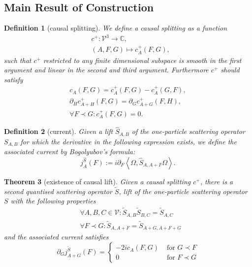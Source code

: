 \documentclass[b5paper,draft,openbib,12pt]{memoir}
\newtheorem{Def}{Definition}
\newtheorem{Thm}[Def]{Theorem}
\begin{document}
\subsection{Main Result of Construction}


\begin{Def}[causal splitting]
We define a causal splitting as a function 
\begin{align}
&c^+:\mathcal{V}^3\rightarrow \mathbb{C}, \\
&(A,F,G)\mapsto c_A^+(F,G),
\end{align}
such that \(c^+\) restricted to any finite dimensional subspace is smooth in the 
first argument and linear in the second and third argument.
Furthermore \(c^+\) should satisfy
\begin{align}\label{c+ 1}
c_A(F,G)=c_A^+(F,G)-c_A^+(G,F),\\\label{c+ 2}
\partial_H c^+_{A+H}(F,G)=\partial_G c^+_{A+G}(F,H),\\\label{c+ 3}
\forall F \prec G: c_A^+(F,G)=0.
\end{align}
\end{Def}

\begin{Def}[current]
Given a lift \(\hat{S}_{A,B}\) of the one-particle scattering operator \(S_{A,B}\) for which the derivative in the following expression exists,
 we define the associated current by Bogolyubov's formula:
\begin{equation}
j_A^{\hat{S}}(F):=i\partial_F \left\langle \Omega, \hat{S}_{A,A+F} \Omega\right\rangle.
\end{equation}
\end{Def}

\begin{Thm}[existence of causal lift]\label{thm: geometry}
Given a causal splitting \(c^+\), there is a second quantised scattering operator \(\tilde{S}\), lift of the one-particle scattering operator \(S\)
with the following properties
\begin{align}
&\forall A,B,C\in \mathcal{V}:\tilde{S}_{A,B}\tilde{S}_{B,C}=\tilde{S}_{A,C}\label{prop S tilde 1}\\
&\forall F\prec G: \tilde{S}_{A,A+F}=\tilde{S}_{A+G,A+F+G}\label{prop S tilde 2}
\end{align}
and the associated current satisfies
\begin{equation}\label{jurrent S tilde}
\partial_G j_{A+G}^{\tilde{S}}(F)=\left\{\begin{matrix} -2i c_A(F,G)  &\text{ for } G\prec F\\ 0 &\text{ for } F\prec G  \end{matrix} \right.
\end{equation}
\end{Thm}
\end{document}
